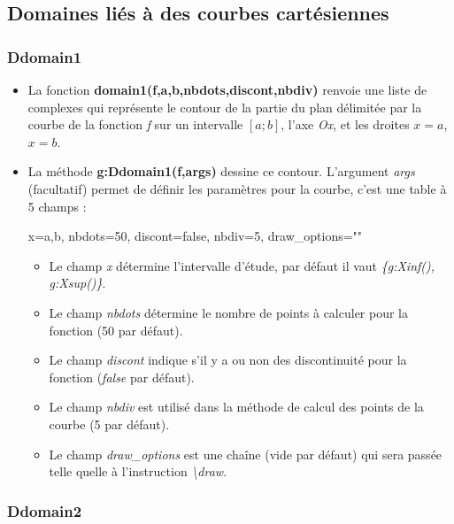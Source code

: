 \subsection{Domaines liés à des courbes cartésiennes}

\subsubsection{Ddomain1}


\begin{itemize}
    \item La fonction \textbf{domain1(f,a,b,nbdots,discont,nbdiv)} renvoie une liste de complexes qui représente le contour de la partie du plan délimitée par la courbe de la fonction \emph{f} sur un intervalle \([a;b]\), l'axe \emph{Ox}, et les droites \(x=a\), \(x=b\).

    \item La méthode \textbf{g:Ddomain1(f,args)} dessine ce contour. L'argument \emph{args} (facultatif) permet de définir les paramètres pour la courbe, c'est une table à 5 champs : 

  \begin{TeXcode}
    { x={a,b},  nbdots=50, discont=false, nbdiv=5, draw_options="" }
  \end{TeXcode}
  
    \begin{itemize}
        \item Le champ \emph{x} détermine l'intervalle d'étude, par défaut il vaut \emph{\{g:Xinf(), g:Xsup()\}}.
        \item Le champ \emph{nbdots} détermine le nombre de points à calculer pour la fonction (50 par défaut).
        \item Le champ \emph{discont} indique s'il y a ou non des discontinuité pour la fonction (\emph{false} par défaut).
        \item Le champ \emph{nbdiv} est utilisé dans la méthode de calcul des points de la courbe (5 par défaut).
        \item Le champ \emph{draw\_options} est une chaîne (vide par défaut) qui sera passée telle quelle à l'instruction \emph{\textbackslash draw}.
    \end{itemize}
\end{itemize}
    
\subsubsection{Ddomain2}

